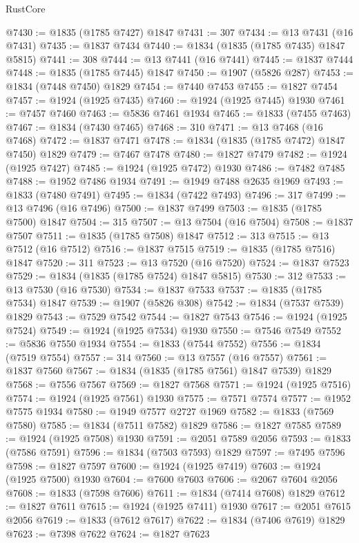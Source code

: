 \begin{lexlean}{RustCore}
\begin{coremodule}
@7430 := @1835 (@1785 @7427) @1847
@7431 := 307
@7434 := @13 @7431 (@16 @7431)
@7435 := @1837 @7434
@7440 := @1834 (@1835 (@1785 @7435) @1847 @5815)
@7441 := 308
@7444 := @13 @7441 (@16 @7441)
@7445 := @1837 @7444
@7448 := @1835 (@1785 @7445) @1847
@7450 := @1907 (@5826 @287)
@7453 := @1834 (@7448 @7450) @1829
@7454 := @7440 @7453
@7455 := @1827 @7454
@7457 := @1924 (@1925 @7435)
@7460 := @1924 (@1925 @7445) @1930
@7461 := @7457 @7460
@7463 := @5836 @7461 @1934
@7465 := @1833 (@7455 @7463)
@7467 := @1834 (@7430 @7465)
@7468 := 310
@7471 := @13 @7468 (@16 @7468)
@7472 := @1837 @7471
@7478 := @1834 (@1835 (@1785 @7472) @1847 @7450) @1829
@7479 := @7467 @7478
@7480 := @1827 @7479
@7482 := @1924 (@1925 @7427)
@7485 := @1924 (@1925 @7472) @1930
@7486 := @7482 @7485
@7488 := @1952 @7486 @1934
@7491 := @1949 @7488 @2635 @1969
@7493 := @1833 (@7480 @7491)
@7495 := @1834 (@7422 @7493)
@7496 := 317
@7499 := @13 @7496 (@16 @7496)
@7500 := @1837 @7499
@7503 := @1835 (@1785 @7500) @1847
@7504 := 315
@7507 := @13 @7504 (@16 @7504)
@7508 := @1837 @7507
@7511 := @1835 (@1785 @7508) @1847
@7512 := 313
@7515 := @13 @7512 (@16 @7512)
@7516 := @1837 @7515
@7519 := @1835 (@1785 @7516) @1847
@7520 := 311
@7523 := @13 @7520 (@16 @7520)
@7524 := @1837 @7523
@7529 := @1834 (@1835 (@1785 @7524) @1847 @5815)
@7530 := 312
@7533 := @13 @7530 (@16 @7530)
@7534 := @1837 @7533
@7537 := @1835 (@1785 @7534) @1847
@7539 := @1907 (@5826 @308)
@7542 := @1834 (@7537 @7539) @1829
@7543 := @7529 @7542
@7544 := @1827 @7543
@7546 := @1924 (@1925 @7524)
@7549 := @1924 (@1925 @7534) @1930
@7550 := @7546 @7549
@7552 := @5836 @7550 @1934
@7554 := @1833 (@7544 @7552)
@7556 := @1834 (@7519 @7554)
@7557 := 314
@7560 := @13 @7557 (@16 @7557)
@7561 := @1837 @7560
@7567 := @1834 (@1835 (@1785 @7561) @1847 @7539) @1829
@7568 := @7556 @7567
@7569 := @1827 @7568
@7571 := @1924 (@1925 @7516)
@7574 := @1924 (@1925 @7561) @1930
@7575 := @7571 @7574
@7577 := @1952 @7575 @1934
@7580 := @1949 @7577 @2727 @1969
@7582 := @1833 (@7569 @7580)
@7585 := @1834 (@7511 @7582) @1829
@7586 := @1827 @7585
@7589 := @1924 (@1925 @7508) @1930
@7591 := @2051 @7589 @2056
@7593 := @1833 (@7586 @7591)
@7596 := @1834 (@7503 @7593) @1829
@7597 := @7495 @7596
@7598 := @1827 @7597
@7600 := @1924 (@1925 @7419)
@7603 := @1924 (@1925 @7500) @1930
@7604 := @7600 @7603
@7606 := @2067 @7604 @2056
@7608 := @1833 (@7598 @7606)
@7611 := @1834 (@7414 @7608) @1829
@7612 := @1827 @7611
@7615 := @1924 (@1925 @7411) @1930
@7617 := @2051 @7615 @2056
@7619 := @1833 (@7612 @7617)
@7622 := @1834 (@7406 @7619) @1829
@7623 := @7398 @7622
@7624 := @1827 @7623

\end{coremodule}
\end{lexlean}
